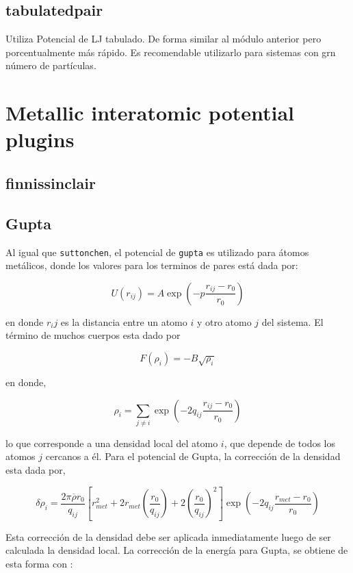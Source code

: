 \subsection{tabulatedpair}
Utiliza Potencial de LJ tabulado. De forma similar al m\'odulo anterior pero
porcentualmente m\'as r\'apido. Es recomendable utilizarlo para sistemas con grn
n\'umero de part\'iculas.


\section{Metallic interatomic potential plugins}

\subsection{finnissinclair}

\subsection{Gupta}

Al igual que \verb|suttonchen|, el potencial de \verb|gupta| es utilizado para
\'atomos met\'alicos, donde los valores para los terminos de pares est\'a dada
por:

$$U(r_{ij}) = A\exp{\left(-p\frac{r_{ij}-r_0}{r_0}\right)}$$

en donde $r_ij$ es la distancia entre un atomo $i$ y otro atomo $j$ del sistema.
El t\'ermino de muchos cuerpos esta dado por

$$F(\rho_{i}) = -B\sqrt{\rho_i}$$

en donde,

$$\rho_i = \sum_{j\neq i} \exp{\left(-2q_{ij}\frac{r_{ij}-r_0}{r_0}\right)}$$

lo que corresponde a una densidad local del atomo $i$, que depende de todos los
atomos $j$ cercanos a \'el. Para el potencial de Gupta, la correcci\'on de la
densidad esta dada por,

$$\delta\rho_i=\frac{2\pi\overline{\rho}r_0}{q_{ij}}\left[r^2_{met}+2r_{met}
\left(\frac{r_0}{q_{ij}}\right)+2\left(\frac{r_0}{q_{ij}}\right)^2\right]\exp{
\left(-2q_{ij}\frac{r_{met}-r_0}{r_0}\right)}$$

Esta correcci\'on de la densidad debe ser aplicada inmediatamente luego de ser
calculada la densidad local. La correcci\'on de la energ\'ia para Gupta, se
obtiene de esta forma con :

